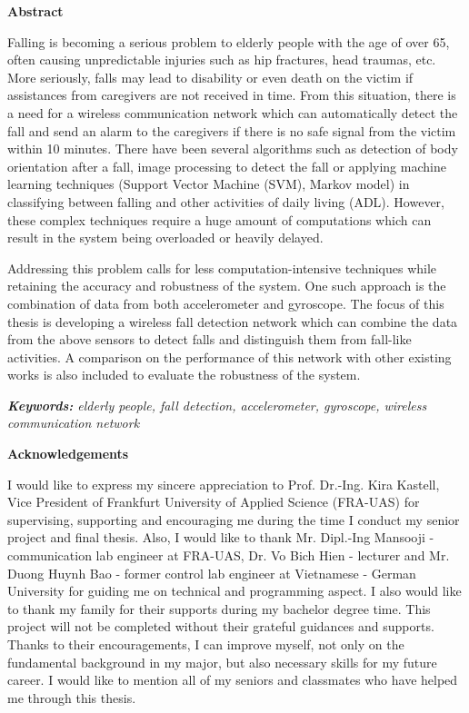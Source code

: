 \begin{center}\textbf{Abstract}\end{center}
{
	\par
	Falling is becoming a serious problem to elderly people with the age of over 65, often causing unpredictable injuries such as hip fractures, head traumas, etc. More seriously, falls may lead to disability or even death on the victim if assistances from caregivers are not received in time. From this situation, there is a need for a wireless communication network which can automatically detect the fall and send an alarm to the caregivers if there is no safe signal from the victim within 10 minutes. There have been several algorithms such as detection of body orientation after a fall, image processing to detect the fall or applying machine learning techniques (Support Vector Machine (SVM), Markov model) in classifying between falling and other activities of daily living (ADL). However, these complex techniques require a huge amount of computations which can result in the system being overloaded or heavily delayed.\par
	Addressing this problem calls for less computation-intensive techniques while retaining the accuracy and robustness of the system. One such approach is the combination of data from both accelerometer and gyroscope. The focus of this thesis is developing a wireless fall detection network which can combine the data from the above sensors to detect falls and distinguish them from fall-like activities. A comparison on the performance of this network with other existing works is also included to evaluate the robustness of the system.\par
	\vspace{1cm}
	\textit{\textbf{Keywords:} elderly people, fall detection, accelerometer, gyroscope,  wireless communication network}
}
\cleardoublepage

\begin{center}\textbf{Acknowledgements}\end{center}
{
	\par
	I would like to express my sincere appreciation to Prof. Dr.-Ing. Kira Kastell, Vice President of Frankfurt University of Applied Science (FRA-UAS) for supervising, supporting and encouraging me during the time I conduct my senior project and final thesis. Also, I would like to thank Mr. Dipl.-Ing Mansooji - communication lab engineer at FRA-UAS, Dr. Vo Bich Hien - lecturer and Mr. Duong Huynh Bao - former control lab engineer at Vietnamese - German University for guiding me on technical and programming aspect. I also would like to thank my family for their supports during my bachelor degree time. This project will not be completed without their grateful guidances and supports. Thanks to their encouragements, I can improve myself, not only on the fundamental background in my major, but also necessary skills for my future career. I would like to mention all of my seniors and classmates who have helped me through this thesis.\par
	\vspace{1cm}
}
\cleardoublepage

